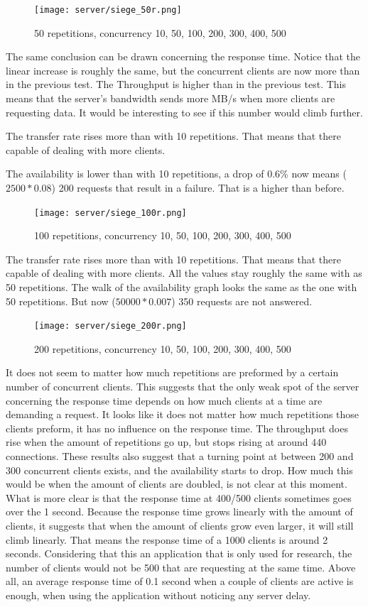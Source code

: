 \vspace{0.5cm}
\begin{figure}[H]
\center
\texttt{[image: server/siege\_50r.png]}
\caption{50 repetitions, concurrency 10, 50, 100, 200, 300, 400, 500}
\end{figure}
The same conclusion can be drawn concerning the response time. Notice that the linear increase is roughly the same, but the concurrent clients are now more than in the previous test.
The Throughput is higher than in the previous test. This means that the server's bandwidth sends more MB/s when more clients are requesting data. It would be interesting to see if this number would climb further.

The transfer rate rises more than with 10 repetitions. That means that there capable of dealing with more clients.

The availability is lower than with 10 repetitions, a drop of 0.6\% now means ($2500 * 0.08$) 200 requests that result in a failure. That is a higher than before.
\begin{figure}[H]
\center
\texttt{[image: server/siege\_100r.png]}
\caption{100 repetitions, concurrency 10, 50, 100, 200, 300, 400, 500}
\end{figure}
The transfer rate rises more than with 10 repetitions. That means that there capable of dealing with more clients.
All the values stay roughly the same with as 50 repetitions. The walk of the availability graph looks the same as the one with 50 repetitions. But now ($50000 * 0.007$) 350 requests are not answered.

\begin{figure}[H]
\center
\texttt{[image: server/siege\_200r.png]}
\caption{200 repetitions, concurrency 10, 50, 100, 200, 300, 400, 500}
\end{figure}

It does not seem to matter how much repetitions are preformed by a certain number of concurrent clients. This suggests that the only weak spot of the server concerning the response time depends on how much clients at a time are demanding a request. It looks like it does not matter how much repetitions those clients preform, it has no influence on the response time. The throughput does rise when the amount of repetitions go up, but stops rising at around 440 connections. 
These results also suggest that a turning point at between 200 and 300 concurrent clients exists, and the availability starts to drop. How much this would be when the amount of clients are doubled, is not clear at this moment. What is more clear is that the response time at 400/500 clients sometimes goes over the 1 second. Because the response time grows linearly with the amount of clients, it suggests that when the amount of clients grow even larger, it will still climb linearly. That means the response time of a 1000 clients is around 2 seconds.
Considering that this an application that is only used for research, the number of clients would not be 500 that are requesting at the same time. Above all, an average response time of 0.1 second when a couple of clients are active is enough, when using the application without noticing any server delay.

